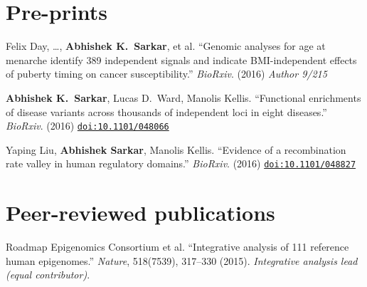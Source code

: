 \documentclass{article}
\begin{document}
\section*{Pre-prints}
\begin{henum}
\item Felix Day, \ldots, \textbf{Abhishek K.\ Sarkar}, et al. ``Genomic
  analyses for age at menarche identify 389 independent signals and indicate
  BMI-independent effects of puberty timing on cancer susceptibility.''
  \emph{BioRxiv}. (2016) \emph{Author 9/215}
\item \textbf{Abhishek K.\ Sarkar}, Lucas D.\ Ward, Manolis Kellis.
  ``Functional enrichments of disease variants across thousands of independent
  loci in eight diseases.'' \emph{BioRxiv}. (2016)
  \href{http://biorxiv.org/content/early/2016/04/11/048066}{\texttt{doi:10.1101/048066}}
\item Yaping Liu, \textbf{Abhishek Sarkar}, Manolis Kellis. ``Evidence of a
  recombination rate valley in human regulatory domains.'' \emph{BioRxiv}.
  (2016) \href{http://biorxiv.org/content/early/2016/04/15/048827}{\texttt{doi:10.1101/048827}}
\end{henum}

\section*{Peer-reviewed publications}
\begin{henum}
\item Roadmap Epigenomics Consortium et al. ``Integrative analysis of 111
  reference human epigenomes.'' \emph{Nature}, 518(7539), 317–330 (2015).
  \emph{Integrative analysis lead (equal contributor)}.
\end{henum}
\end{document}
